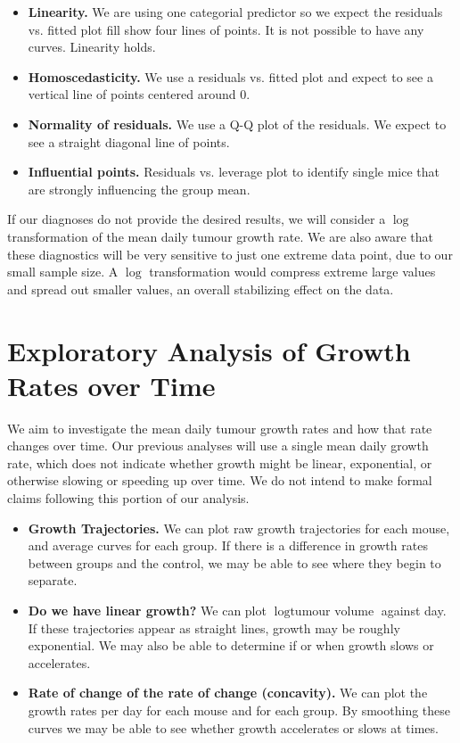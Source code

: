 \documentclass[12pt]{article}\usepackage[]{graphicx}\usepackage[]{xcolor}
\begin{document}
\begin{itemize}

\item \textbf{Linearity.} We are using one categorial predictor so we expect the residuals vs. fitted plot fill show four lines of points. It is not possible to have any curves. Linearity holds.

\item \textbf{Homoscedasticity.} We use a residuals vs. fitted plot and expect to see a vertical line of points centered around 0. 

\item \textbf{Normality of residuals.} We use a Q-Q plot of the residuals. We expect to see a straight diagonal line of points. 

\item \textbf{Influential points.} Residuals vs. leverage plot to identify single mice that are strongly influencing the group mean. 
\end{itemize}

If our diagnoses do not provide the desired results, we will consider a $\log$ transformation of the mean daily tumour growth rate. We are also aware that these diagnostics will be very sensitive to just one extreme data point, due to our small sample size. A $\log$ transformation would compress extreme large values and spread out smaller values, an overall stabilizing effect on the data. 

\section{Exploratory Analysis of Growth Rates over Time}

We aim to investigate the mean daily tumour growth rates and how that rate changes over time. Our previous analyses will use a single mean daily growth rate, which does not indicate whether growth might be linear, exponential, or otherwise slowing or speeding up over time. We do not intend to make formal claims following this portion of our analysis. 

\begin{itemize}

\item \textbf{Growth Trajectories.} We can plot raw growth trajectories for each mouse, and average curves for each group. If there is a difference in growth rates between groups and the control, we may be able to see where they begin to separate. 

\item \textbf{Do we have linear growth?} We can plot $\log{\text{tumour volume}}$ against day. If these trajectories appear as straight lines, growth may be roughly exponential. We may also be able to determine if or when growth slows or accelerates. 

\item \textbf{Rate of change of the rate of change (concavity).} We can plot the growth rates per day for each mouse and for each group. By smoothing these curves we may be able to see whether growth accelerates or slows at times. 
\end{itemize}
\end{document}
